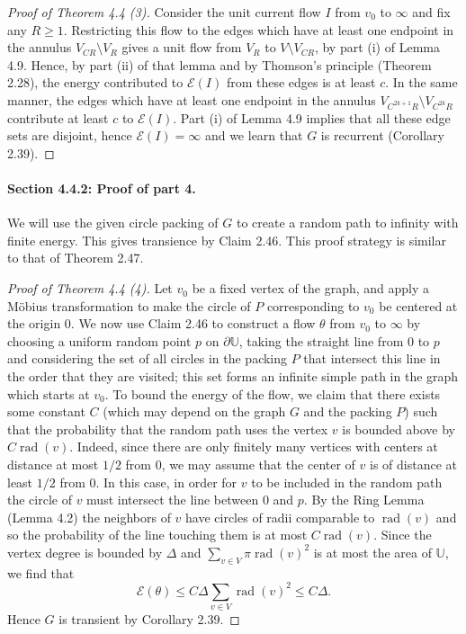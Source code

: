 \begin{proof}[Proof of Theorem 4.4 (3)]
Consider the unit current flow $I$ from $v_0$ to $\infty$ and fix any $R\ge1$. Restricting this flow to the edges which have at least one endpoint in the annulus $V_{CR}\setminus V_R$ gives a unit flow from $V_R$ to $V\setminus V_{CR}$, by part (i) of Lemma 4.9. Hence, by part (ii) of that lemma and by Thomson's principle (Theorem 2.28), the energy contributed to $\mathcal E(I)$ from these edges is at least $c$.
In the same manner, the edges which have at least one endpoint in the annulus $V_{C^{2k+1}R}\setminus V_{C^{2k}R}$ contribute at least $c$ to $\mathcal E(I)$. Part (i) of Lemma 4.9 implies that all these edge sets are disjoint, hence $\mathcal E(I)=\infty$ and we learn that $G$ is recurrent (Corollary 2.39).
\end{proof}

\paragraph{Section 4.4.2: Proof of part 4.}
We will use the given circle packing of $G$ to create a random path to infinity with finite energy. This gives transience by Claim 2.46. This proof strategy is similar to that of Theorem 2.47.
\begin{proof}[Proof of Theorem 4.4 (4)]
Let $v_0$ be a fixed vertex of the graph, and apply a M\"obius transformation to make the circle of $P$ corresponding to $v_0$ be centered at the origin $0$.
We now use Claim 2.46 to construct a flow $\theta$ from $v_0$ to $\infty$ by choosing a uniform random point $p$ on $\partial\mathbb U$, taking the straight line from $0$ to $p$ and considering the set of all circles in the packing $P$ that intersect this line in the order that they are visited; this set forms an infinite simple path in the graph which starts at $v_0$.
To bound the energy of the flow, we claim that there exists some constant $C$ (which may depend on the graph $G$ and the packing $P$) such that the probability that the random path uses the vertex $v$ is bounded above by $C\operatorname{rad}(v)$. Indeed, since there are only finitely many vertices with centers at distance at most $1/2$ from $0$, we may assume that the center of $v$ is of distance at least $1/2$ from $0$. In this case, in order for $v$ to be included in the random path the circle of $v$ must intersect the line between $0$ and $p$. By the Ring Lemma (Lemma 4.2) the neighbors of $v$ have circles of radii comparable to $\operatorname{rad}(v)$ and so the probability of the line touching them is at most $C\operatorname{rad}(v)$. Since the vertex degree is bounded by $\Delta$ and $\sum_{v\in V}\pi\operatorname{rad}(v)^2$ is at most the area of $\mathbb U$, we find that
\[
\mathcal E(\theta)\le C\Delta\sum_{v\in V}\operatorname{rad}(v)^2\le C\Delta.
\]
Hence $G$ is transient by Corollary 2.39.
\end{proof}
